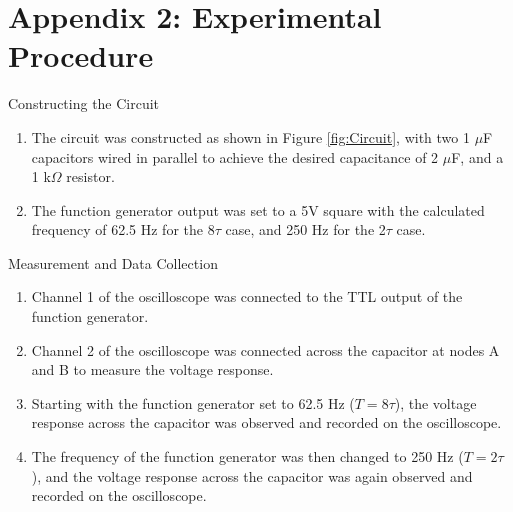 \documentclass[12pt]{article}
\begin{document}
\section*{Appendix 2: Experimental Procedure}
Constructing the Circuit
\begin{enumerate}
    \item The circuit was constructed as shown in Figure \ref{fig:Circuit}, with two 1 $\mu$F capacitors wired in parallel to achieve the desired capacitance of 2 $\mu$F, and a 1 k$\Omega$ resistor. 
    \item The function generator output was set to a 5V square with the calculated frequency of 62.5 Hz for the 8$\tau$ case, and 250 Hz for the 2$\tau$ case.
\end{enumerate}
Measurement and Data Collection
\begin{enumerate}
    \item Channel 1 of the oscilloscope was connected to the TTL output of the function generator.
    \item Channel 2 of the oscilloscope was connected across the capacitor at nodes A and B to measure the voltage response.
    \item Starting with the function generator set to 62.5 Hz ($T = 8\tau$), the voltage response across the capacitor was observed and recorded on the oscilloscope.
    \item The frequency of the function generator was then changed to 250 Hz ($T = 2\tau$), and the voltage response across the capacitor was again observed and recorded on the oscilloscope.
\end{enumerate}
\end{document}
